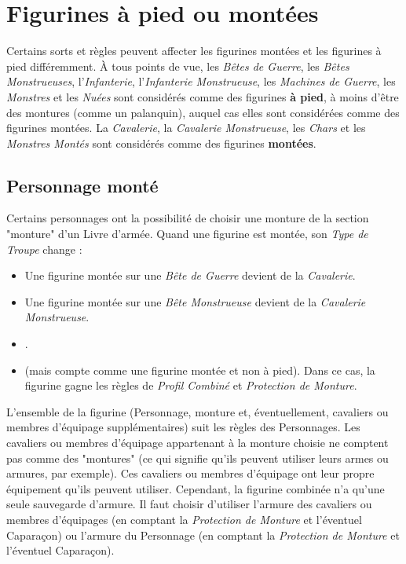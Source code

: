 \section{Figurines à pied ou montées}

Certains sorts et règles peuvent affecter les figurines montées et les figurines à pied différemment. À tous points de vue, les \emph{Bêtes de Guerre}, les \emph{Bêtes Monstrueuses}, l'\emph{Infanterie}, l'\emph{Infanterie Monstrueuse}, les \emph{Machines de Guerre}, les \emph{Monstres} et les \emph{Nuées} sont considérés comme des figurines \textbf{à pied}, à moins d'être des montures (comme un palanquin), auquel cas elles sont considérées comme des figurines montées. La \emph{Cavalerie}, la \emph{Cavalerie Monstrueuse}, les \emph{Chars} et les \emph{Monstres Montés} sont considérés comme des figurines \textbf{montées}.

\subsection{Personnage monté}
Certains personnages ont la possibilité de choisir une monture de la section "monture" d'un Livre d'armée. Quand une figurine est montée, son \emph{Type de Troupe} change :
\begin{itemize}[label={-}]
\item Une figurine montée sur une \emph{Bête de Guerre} devient de la \emph{Cavalerie}.
\item Une figurine montée sur une \emph{Bête Monstrueuse} devient de la \emph{Cavalerie Monstrueuse}.
\item {}.
\item {} (mais compte comme une figurine montée et non à pied). Dans ce cas, la figurine gagne les règles de \emph{Profil Combiné} et \emph{Protection de Monture}.
\end{itemize}
L'ensemble de la figurine (Personnage, monture et, éventuellement, cavaliers ou membres d'équipage supplémentaires) suit les règles des Personnages. Les cavaliers ou membres d'équipage appartenant à la monture choisie ne comptent pas comme des "montures" (ce qui signifie qu'ils peuvent utiliser leurs armes ou armures, par exemple). Ces cavaliers ou membres d'équipage ont leur propre équipement qu'ils peuvent utiliser. Cependant, la figurine combinée n'a qu'une seule sauvegarde d'armure. Il faut choisir d'utiliser l'armure des cavaliers ou membres d'équipages (en comptant la \emph{Protection de Monture} et l'éventuel Caparaçon) ou l'armure du Personnage (en comptant la \emph{Protection de Monture} et l'éventuel Caparaçon).

